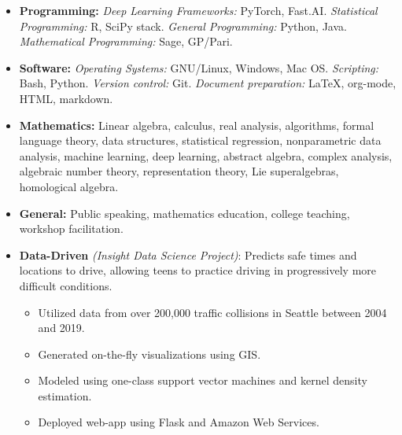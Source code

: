 \documentclass[10pt]{article}
\begin{document}
{

\begin{itemize}
  \item \textbf{Programming:} \textit{Deep Learning Frameworks:} PyTorch, Fast.AI. \textit{Statistical Programming:} R, SciPy stack. \textit{General Programming:} Python, Java. \textit{Mathematical Programming:} Sage, GP/Pari. 
  \item \textbf{Software:} \textit{Operating Systems:} GNU/Linux, Windows, Mac OS. \textit{Scripting:} Bash, Python. \textit{Version control:} Git. \textit{Document preparation:} \LaTeX, org-mode, HTML, markdown.
   \item \textbf{Mathematics:} Linear algebra, calculus, real analysis, algorithms, formal language theory, data structures, statistical regression, nonparametric data analysis, machine learning, deep learning, abstract algebra, complex analysis, algebraic number theory, representation theory, Lie superalgebras, homological algebra.
   \item \textbf{General:} Public speaking, mathematics education, college teaching, workshop facilitation.
 \end{itemize}

\spacedhrule{0.5em}{-0.4em}

\begin{itemize}
  \item \textbf{Data-Driven} \emph{(Insight Data Science Project)}: Predicts safe times and locations to drive, allowing teens to practice driving in progressively more difficult conditions.
  
  \begin{itemize}
    \item Utilized data from over 200,000 traffic collisions in Seattle between 2004 and 2019.
    \item Generated on-the-fly visualizations using GIS.
    \item Modeled using one-class support vector machines and kernel density estimation.
    \item Deployed web-app using Flask and Amazon Web Services.
  \end{itemize} 
\end{itemize}

}
\end{document}
